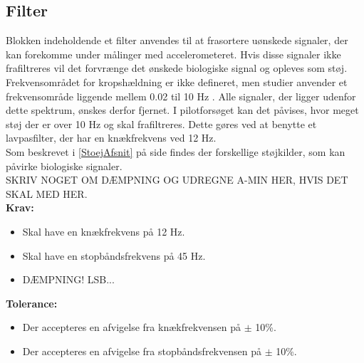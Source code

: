\subsection{Filter}
Blokken indeholdende et filter anvendes til at frasortere uønskede signaler, der kan forekomme under målinger med accelerometeret. Hvis disse signaler ikke frafiltreres vil det forvrænge det ønskede biologiske signal og opleves som støj. Frekvensområdet for kropshældning er ikke defineret, men studier anvender et frekvensområde liggende mellem 0.02 til 10 Hz \cite{Martinez-Mendez2011}. Alle signaler, der ligger udenfor dette spektrum, ønskes derfor fjernet. I pilotforsøget kan det påvises, hvor meget støj der er over 10 Hz og skal frafiltreres. Dette gøres ved at benytte et lavpasfilter, der har en knækfrekvens ved 12 Hz. \\
Som beskrevet i \ref{StoejAfsnit} på side \pageref{StoejAfsnit} findes der forskellige støjkilder, som kan påvirke biologiske signaler. \\
SKRIV NOGET OM DÆMPNING OG UDREGNE A-MIN HER, HVIS DET SKAL MED HER.\\
\textbf{Krav:}
\begin{itemize}
\item Skal have en knækfrekvens på 12 Hz.
\item Skal have en stopbåndsfrekvens på 45 Hz.
\item DÆMPNING! LSB...
\end{itemize}
\textbf{Tolerance:}
\begin{itemize}
\item Der accepteres en afvigelse fra knækfrekvensen på $\pm$ 10\%.
\item Der accepteres en afvigelse fra stopbåndsfrekvensen på $\pm$ 10\%.
\end{itemize}
